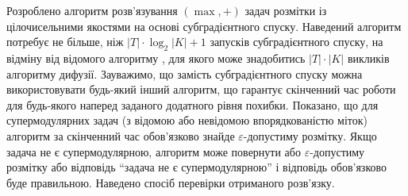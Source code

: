 \chapterConclusion

Розроблено алгоритм розв’язування $(\max ,+)$ задач розмітки із
цілочисельними якостями на основі субградієнтного спуску.
Наведений алгоритм потребує не більше, ніж $|T|\cdot \log_2 |K| + 1$
запусків субградієнтного спуску,
на відміну від відомого алгоритму \cite{diffusion_shlezinger},
для якого може знадобитись $|T|\cdot|K|$ викликів алгоритму дифузії.
Зауважимо, що замість субградієнтного спуску можна використовувати
будь-який інший алгоритм, що гарантує скінченний час роботи
для будь-якого наперед заданого додатного рівня похибки.
Показано, що для
супермодулярних задач (з відомою або невідомою впорядкованістю міток) алгоритм
за скінченний час обов'язково знайде $\varepsilon$-допустиму розмітку.
Якщо задача не є супермодулярною, алгоритм може повернути або $\varepsilon$-допустиму
розмітку або відповідь ``задача не є супермодулярною''
і відповідь обов'язково буде правильною.
Наведено спосіб перевірки отриманого розв'язку.
